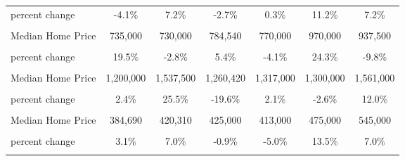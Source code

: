 \begin{table}
\begin{tabular}{lcccccc}
percent change & -4.1\% & 7.2\% & -2.7\% & 0.3\% & 11.2\% & 7.2\%\\
\textbf{\cellcolor{gray!6}{Santa Barbara County}} & \textbf{\cellcolor{gray!6}{}} & \textbf{\cellcolor{gray!6}{}} & \textbf{\cellcolor{gray!6}{}} & \textbf{\cellcolor{gray!6}{}} & \textbf{\cellcolor{gray!6}{}} & \textbf{\cellcolor{gray!6}{}}\\
Median Home Price & 735,000 & 730,000 & 784,540 & 770,000 & 970,000 & 937,500\\
\cellcolor{gray!6}{Median Home Price (\$2009)} & \cellcolor{gray!6}{658,391} & \cellcolor{gray!6}{640,275} & \cellcolor{gray!6}{674,603} & \cellcolor{gray!6}{647,126} & \cellcolor{gray!6}{804,574} & \cellcolor{gray!6}{725,426}\\
\addlinespace
percent change & 19.5\% & -2.8\% & 5.4\% & -4.1\% & 24.3\% & -9.8\%\\
\textbf{\cellcolor{gray!6}{South Coast}} & \textbf{\cellcolor{gray!6}{}} & \textbf{\cellcolor{gray!6}{}} & \textbf{\cellcolor{gray!6}{}} & \textbf{\cellcolor{gray!6}{}} & \textbf{\cellcolor{gray!6}{}} & \textbf{\cellcolor{gray!6}{}}\\
Median Home Price & 1,200,000 & 1,537,500 & 1,260,420 & 1,317,000 & 1,300,000 & 1,561,000\\
\cellcolor{gray!6}{Median Home Price (\$2009)} & \cellcolor{gray!6}{1,074,924} & \cellcolor{gray!6}{1,348,524} & \cellcolor{gray!6}{1,083,799} & \cellcolor{gray!6}{1,106,838} & \cellcolor{gray!6}{1,078,295} & \cellcolor{gray!6}{1,207,883}\\
percent change & 2.4\% & 25.5\% & -19.6\% & 2.1\% & -2.6\% & 12.0\%\\
\addlinespace
\textbf{\cellcolor{gray!6}{North Coast}} & \textbf{\cellcolor{gray!6}{}} & \textbf{\cellcolor{gray!6}{}} & \textbf{\cellcolor{gray!6}{}} & \textbf{\cellcolor{gray!6}{}} & \textbf{\cellcolor{gray!6}{}} & \textbf{\cellcolor{gray!6}{}}\\
Median Home Price & 384,690 & 420,310 & 425,000 & 413,000 & 475,000 & 545,000\\
\cellcolor{gray!6}{Median Home Price (\$2009)} & \cellcolor{gray!6}{344,594} & \cellcolor{gray!6}{368,649} & \cellcolor{gray!6}{365,445} & \cellcolor{gray!6}{347,095} & \cellcolor{gray!6}{393,993} & \cellcolor{gray!6}{421,714}\\
percent change & 3.1\% & 7.0\% & -0.9\% & -5.0\% & 13.5\% & 7.0\%\\
\textbf{\cellcolor{gray!6}{San Luis Obispo County}} & \textbf{\cellcolor{gray!6}{}} & \textbf{\cellcolor{gray!6}{}} & \textbf{\cellcolor{gray!6}{}} & \textbf{\cellcolor{gray!6}{}} & \textbf{\cellcolor{gray!6}{}} & \textbf{\cellcolor{gray!6}{}}\\

\end{tabular}
\end{table}
